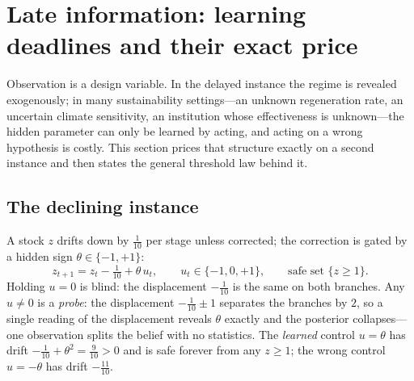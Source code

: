 \documentclass[11pt,a4paper]{article}
\theoremstyle{plain}
\theoremstyle{definition}
\theoremstyle{remark}
\newcommand{\tfr}[2]{\tfrac{#1}{#2}}
\begin{document}
\section{Late information: learning deadlines and their exact price}\label{sec:deadline}

Observation is a design variable. In the delayed instance the regime is revealed exogenously; in many sustainability settings---an unknown regeneration rate, an uncertain climate sensitivity, an institution whose effectiveness is unknown---the hidden parameter can only be learned by acting, and acting on a wrong hypothesis is costly. This section prices that structure exactly on a second instance and then states the general threshold law behind it.

\subsection{The declining instance}

A stock $z$ drifts down by $\tfr1{10}$ per stage unless corrected; the correction is gated by a hidden sign $\theta\in\{-1,+1\}$:
\begin{equation}\label{eq:declining}
z_{t+1}=z_t-\tfr1{10}+\theta\,u_t,\qquad u_t\in\{-1,0,+1\},\qquad\text{safe set }\{z\ge1\}.
\end{equation}
Holding $u=0$ is blind: the displacement $-\tfr1{10}$ is the same on both branches. Any $u\neq0$ is a \emph{probe}: the displacement $-\tfr1{10}\pm1$ separates the branches by $2$, so a single reading of the displacement reveals $\theta$ exactly and the posterior collapses---one observation splits the belief with no statistics. The \emph{learned} control $u=\theta$ has drift $-\tfr1{10}+\theta^{2}=\tfr9{10}>0$ and is safe forever from any $z\ge1$; the wrong control $u=-\theta$ has drift $-\tfr{11}{10}$.
\end{document}
